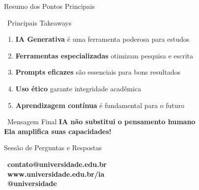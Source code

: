 \documentclass[aspectratio=169,12pt]{beamer}
\begin{document}

\begin{frame}{Resumo dos Pontos Principais}
    \begin{block}{\faList\, Principais Takeaways}
        \begin{enumerate}
            \item \textbf{IA Generativa} é uma ferramenta poderosa para estudos
            \item \textbf{Ferramentas especializadas} otimizam pesquisa e escrita
            \item \textbf{Prompts eficazes} são essenciais para bons resultados
            \item \textbf{Uso ético} garante integridade acadêmica
            \item \textbf{Aprendizagem contínua} é fundamental para o futuro
        \end{enumerate}
    \end{block}
    
    \begin{alertblock}{\faBullhorn\, Mensagem Final}
        \centering
        \textbf{IA não substitui o pensamento humano} \\
        \textbf{Ela amplifica suas capacidades!}
    \end{alertblock}
\end{frame}

\begin{frame}{Sessão de Perguntas e Respostas}
    \begin{center}
        
        \vspace{1cm}
        
        \textcolor{accent}{\faEnvelope}\, \textbf{contato@universidade.edu.br} \\
        \textcolor{secondary}{\faGlobe}\, \textbf{www.universidade.edu.br/ia} \\
        \textcolor{success}{\faLinkedin}\, \textbf{@universidade} \\
    \end{center}
\end{frame}
\end{document}
